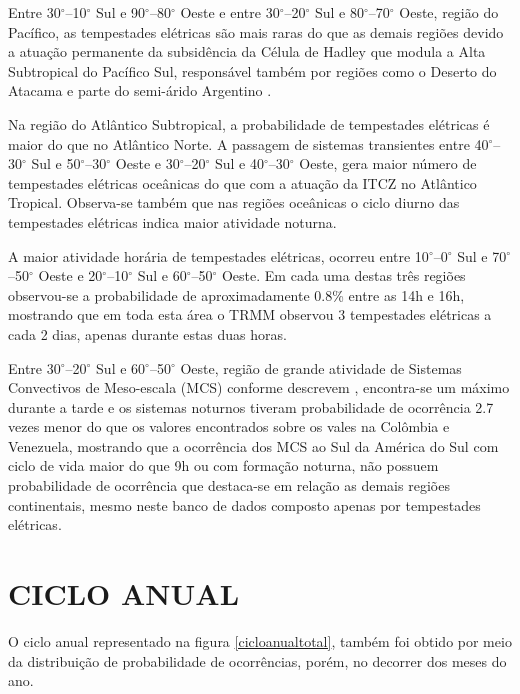 Entre 30$^{\circ}$--10$^{\circ}$ Sul e 90$^{\circ}$--80$^{\circ}$ Oeste e entre 30$^{\circ}$--20$^{\circ}$ Sul e 80$^{\circ}$--70$^{\circ}$ Oeste, região do Pacífico, as tempestades elétricas são mais raras do que as demais regiões devido a atuação permanente da subsidência da Célula de Hadley que modula a Alta Subtropical do Pacífico Sul, responsável também por regiões como o Deserto do Atacama e parte do semi-árido Argentino \cite{reboita2010regimes}.

Na região do Atlântico Subtropical, a probabilidade de tempestades elétricas é maior do que no Atlântico Norte. A passagem de sistemas transientes entre 40$^{\circ}$--30$^{\circ}$ Sul e 50$^{\circ}$--30$^{\circ}$ Oeste e 30$^{\circ}$--20$^{\circ}$ Sul e 40$^{\circ}$--30$^{\circ}$ Oeste, gera maior número de tempestades elétricas oceânicas do que com a atuação da ITCZ no Atlântico Tropical. Observa-se também que nas regiões oceânicas o ciclo diurno das tempestades elétricas indica maior atividade noturna.


A maior atividade horária de tempestades elétricas, ocorreu entre 10$^{\circ}$--0$^{\circ}$ Sul e 70$^{\circ}$--50$^{\circ}$ Oeste e 20$^{\circ}$--10$^{\circ}$ Sul e 60$^{\circ}$--50$^{\circ}$ Oeste. Em cada uma destas três regiões observou-se a probabilidade de aproximadamente 0.8\% entre as 14h e 16h, mostrando que em toda esta área o TRMM observou 3 tempestades elétricas a cada 2 dias, apenas durante estas duas horas.


Entre 30$^{\circ}$--20$^{\circ}$ Sul e 60$^{\circ}$--50$^{\circ}$ Oeste,  região de grande atividade de Sistemas Convectivos de Meso-escala (MCS) conforme descrevem , encontra-se um máximo durante a tarde e os sistemas noturnos tiveram probabilidade de ocorrência 2.7 vezes menor do que os valores encontrados sobre os vales na Colômbia e Venezuela, mostrando que a ocorrência dos MCS ao Sul da América do Sul com ciclo de vida maior do que 9h ou com formação noturna, não possuem probabilidade de ocorrência que destaca-se em relação as demais regiões continentais, mesmo neste banco de dados composto apenas por tempestades elétricas. 

\section{CICLO ANUAL}

O ciclo anual representado na figura \ref{cicloanualtotal}, também foi obtido por meio da distribuição de probabilidade de ocorrências, porém, no decorrer dos meses do ano.

